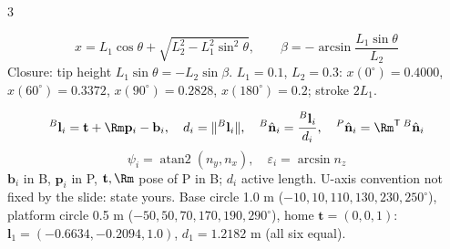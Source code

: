 \begin{multicols}{3}
\begin{fbx}
\[x=L_1\cos\theta+\sqrt{L_2^2-L_1^2\sin^2\theta},\qquad\beta=-\arcsin\frac{L_1\sin\theta}{L_2}\]
Closure: tip height $L_1\sin\theta=-L_2\sin\beta$. $L_1=0.1$, $L_2=0.3$: $x(0^\circ)=0.4000$, $x(60^\circ)=0.3372$, $x(90^\circ)=0.2828$, $x(180^\circ)=0.2$; stroke $2L_1$. \chk
\end{fbx}
\begin{fbx}
\[{}^B\mathbf l_i=\mathbf t+\Rm\mathbf p_i-\mathbf b_i,\quad d_i=\lVert{}^B\mathbf l_i\rVert,\quad{}^B\hat{\mathbf n}_i=\frac{{}^B\mathbf l_i}{d_i},\quad{}^P\hat{\mathbf n}_i=\Rm^{\mathsf T}\,{}^B\hat{\mathbf n}_i\]
\[\psi_i=\operatorname{atan2}(n_y,n_x),\quad\varepsilon_i=\arcsin n_z\]
$\mathbf b_i$ in {B}, $\mathbf p_i$ in {P}, $\mathbf t,\Rm$ pose of {P} in {B}; $d_i$ active length. U-axis convention not fixed by the slide: state yours.
Base circle 1.0 m ($-10,10,110,130,230,250^\circ$), platform circle 0.5 m ($-50,50,70,170,190,290^\circ$), home $\mathbf t=(0,0,1)$: $\mathbf l_1=(-0.6634,-0.2094,1.0)$, $d_1=1.2182$ m (all six equal). \chk
\end{fbx}


\end{multicols}
